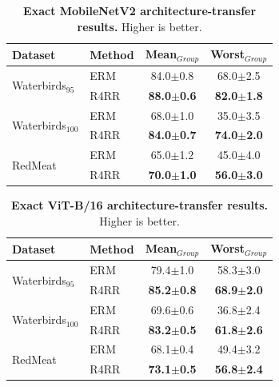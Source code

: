 \documentclass[10pt,twocolumn,letterpaper]{article}
\begin{document}
\begin{table}[h]
\centering
\caption{\textbf{Exact MobileNetV2 architecture-transfer results.} Higher is better.}
\label{tab:supp_exact_mobilenet_transfer}
\small
\setlength{\tabcolsep}{7pt}
\renewcommand{\arraystretch}{1.12}
\begin{tabular}{llcc}
\toprule
\textbf{Dataset} & \textbf{Method} & \textbf{Mean$_{Group}$} & \textbf{Worst$_{Group}$} \\
\midrule
\multirow{2}{*}{Waterbirds$_{95}$}
& ERM  & 84.0{\scriptsize$\pm$0.8} & 68.0{\scriptsize$\pm$2.5} \\
& R4RR & \textbf{88.0{\scriptsize$\pm$0.6}} & \textbf{82.0{\scriptsize$\pm$1.8}} \\
\midrule
\multirow{2}{*}{Waterbirds$_{100}$}
& ERM  & 68.0{\scriptsize$\pm$1.0} & 35.0{\scriptsize$\pm$3.5} \\
& R4RR & \textbf{84.0{\scriptsize$\pm$0.7}} & \textbf{74.0{\scriptsize$\pm$2.0}} \\
\midrule
\multirow{2}{*}{RedMeat}
& ERM  & 65.0{\scriptsize$\pm$1.2} & 45.0{\scriptsize$\pm$4.0} \\
& R4RR & \textbf{70.0{\scriptsize$\pm$1.0}} & \textbf{56.0{\scriptsize$\pm$3.0}} \\
\bottomrule
\end{tabular}
\end{table}

\begin{table}[h]
\centering
\caption{\textbf{Exact ViT-B/16 architecture-transfer results.} Higher is better.}
\label{tab:supp_exact_vit_transfer}
\small
\setlength{\tabcolsep}{7pt}
\renewcommand{\arraystretch}{1.12}
\begin{tabular}{llcc}
\toprule
\textbf{Dataset} & \textbf{Method} & \textbf{Mean$_{Group}$} & \textbf{Worst$_{Group}$} \\
\midrule
\multirow{2}{*}{Waterbirds$_{95}$}
& ERM  & 79.4{\scriptsize$\pm$1.0} & 58.3{\scriptsize$\pm$3.0} \\
& R4RR & \textbf{85.2{\scriptsize$\pm$0.8}} & \textbf{68.9{\scriptsize$\pm$2.0}} \\
\midrule
\multirow{2}{*}{Waterbirds$_{100}$}
& ERM  & 69.6{\scriptsize$\pm$0.6} & 36.8{\scriptsize$\pm$2.4} \\
& R4RR & \textbf{83.2{\scriptsize$\pm$0.5}} & \textbf{61.8{\scriptsize$\pm$2.6}} \\
\midrule
\multirow{2}{*}{RedMeat}
& ERM  & 68.1{\scriptsize$\pm$0.4} & 49.4{\scriptsize$\pm$3.2} \\
& R4RR & \textbf{73.1{\scriptsize$\pm$0.5}} & \textbf{56.8{\scriptsize$\pm$2.4}} \\
\bottomrule
\end{tabular}
\end{table}
\end{document}
